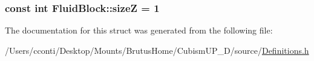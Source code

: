 \subsubsection[{size\+Z}]{\setlength{\rightskip}{0pt plus 5cm}const int Fluid\+Block\+::size\+Z = 1\hspace{0.3cm}{\ttfamily [static]}}\label{struct_fluid_block_a7876602d8791ed7d4734fa20ad0a9574}


The documentation for this struct was generated from the following file\+:\begin{DoxyCompactItemize}
\item 
/\+Users/cconti/\+Desktop/\+Mounts/\+Brutus\+Home/\+Cubism\+U\+P\+\_\+D/source/\hyperlink{_definitions_8h}{Definitions.\+h}\end{DoxyCompactItemize}
